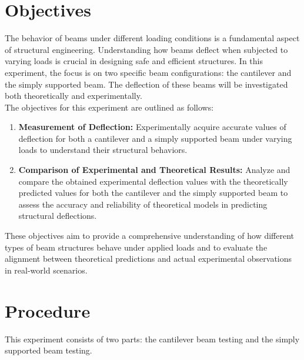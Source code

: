 \documentclass[12pt, titlepage]{article}
\begin{document}
\tableofcontents
\listoffigures
\listoftables
\thispagestyle{tocstyle}
\newpage
\section{Objectives}
The behavior of beams under different loading conditions is a fundamental
aspect of structural engineering. Understanding how beams deflect when
subjected to varying loads is crucial in designing safe and efficient
structures. In this experiment, the focus is on two specific beam
configurations: the cantilever and the simply supported beam. The deflection of
these beams will be investigated both theoretically and experimentally.\\[10pt]
The objectives for this experiment are outlined as follows:
\begin{enumerate}
    \item \textbf{Measurement of Deflection:} Experimentally acquire accurate
      values of deflection for both a cantilever and a simply supported beam
      under varying loads to understand their structural behaviors.
    
    \item \textbf{Comparison of Experimental and Theoretical Results:} Analyze
      and compare the obtained experimental deflection values with the
      theoretically predicted values for both the cantilever and the simply
      supported beam to assess the accuracy and reliability of theoretical
      models in predicting structural deflections.
\end{enumerate}

These objectives aim to provide a comprehensive understanding of how different
types of beam structures behave under applied loads and to evaluate the
alignment between theoretical predictions and actual experimental observations
in real-world scenarios.
\newpage
\section{Procedure}
This experiment consists of two parts: the cantilever beam testing and the
simply supported beam testing.
\end{document}
